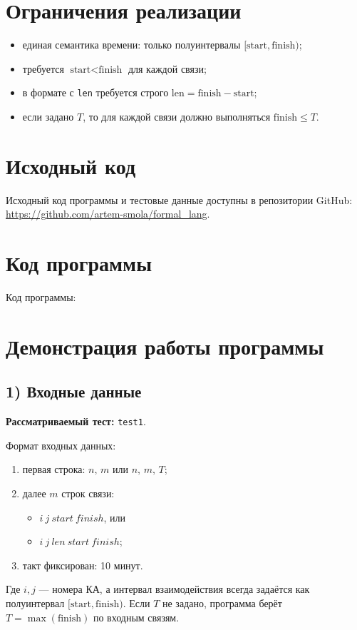 \documentclass[12pt,a4paper]{article}
\begin{document}
\section{Ограничения реализации}
\begin{itemize}
    \item единая семантика времени: только полуинтервалы $[\text{start}, \text{finish})$;
    \item требуется $\text{start} < \text{finish}$ для каждой связи;
    \item в формате с \texttt{len} требуется строго $\text{len} = \text{finish} - \text{start}$;
    \item если задано $T$, то для каждой связи должно выполняться $\text{finish} \le T$.
\end{itemize}

\section{Исходный код}
Исходный код программы и тестовые данные доступны в репозитории GitHub:
\url{https://github.com/artem-smola/formal_lang}.

\section{Код программы}

Код программы:

{\small
{}
}

\section{Демонстрация работы программы}
\subsection*{1) Входные данные}
\textbf{Рассматриваемый тест:} \texttt{test1}.

Формат входных данных:
\begin{enumerate}
    \item первая строка: $n,\,m$ или $n,\,m,\,T$;
    \item далее $m$ строк связи:
    \begin{itemize}
        \item $i\ j\ start\ finish$, или
        \item $i\ j\ len\ start\ finish$;
    \end{itemize}
    \item такт фиксирован: 10 минут.
\end{enumerate}
Где $i,j$ --- номера КА, а интервал взаимодействия всегда задаётся как полуинтервал
$[\text{start}, \text{finish})$.
Если $T$ не задано, программа берёт $T = \max(\text{finish})$ по входным связям.
\end{document}

